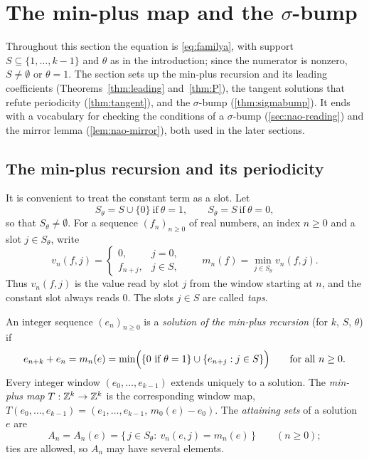 \section{The min-plus map and the \texorpdfstring{$\sigma$}{sigma}-bump}
\label{sec:tropical}

Throughout this section the equation is \eqref{eq:familya}, with support
$S\subseteq\{1,\dots,k-1\}$ and $\theta$ as in the introduction; since the
numerator is nonzero, $S\ne\emptyset$ or $\theta=1$. The section sets up the
min-plus recursion and its leading coefficients (Theorems~\ref{thm:leading}
and~\ref{thm:P}), the tangent solutions that refute periodicity
(\autoref{thm:tangent}), and the $\sigma$-bump (\autoref{thm:sigmabump}). It
ends with a vocabulary for checking the conditions of a $\sigma$-bump
(\autoref{sec:nao-reading}) and the mirror lemma (\autoref{lem:nao-mirror}),
both used in the later sections.

\subsection{The min-plus recursion and its periodicity}
\label{sec:trop-minplus}

It is convenient to treat the constant term as a slot. Let
\[
S_\theta=S\cup\{0\}\ \text{if}\ \theta=1,\qquad S_\theta=S\ \text{if}\ \theta=0,
\]
so that $S_\theta\ne\emptyset$. For a sequence $(f_n)_{n\ge0}$ of real numbers, an index
$n\ge0$ and a slot $j\in S_\theta$, write
\[
v_n(f,j)=\begin{cases}0,&j=0,\\ f_{n+j},&j\in S,\end{cases}
\qquad
m_n(f)=\min_{j\in S_\theta}v_n(f,j).
\]
Thus $v_n(f,j)$ is the value read by slot $j$ from the window starting at $n$, and
the constant slot always reads $0$. The slots $j\in S$ are called \emph{taps}.

\begin{definition}
\label{def:trop-minplus}
An integer sequence $(e_n)_{n\ge0}$ is a \textit{solution of the min-plus
recursion} (for $k$, $S$, $\theta$) if
\begin{equation}
e_{n+k}+e_n=m_n(e)=\min\Bigl(\{0\ \text{if}\ \theta=1\}\cup\{e_{n+j}:j\in S\}\Bigr)
\qquad\text{for all}\ n\ge0.
\label{eq:trop-rec}
\end{equation}
Every integer window $(e_0,\dots,e_{k-1})$ extends uniquely to a solution. The
\textit{min-plus map} $T:\mathbb{Z}^k\to\mathbb{Z}^k$ is the corresponding window map,
$T(e_0,\dots,e_{k-1})=(e_1,\dots,e_{k-1},\,m_0(e)-e_0)$. The
\textit{attaining sets} of a solution $e$ are
\[
A_n=A_n(e)=\{\,j\in S_\theta:\ v_n(e,j)=m_n(e)\,\}\qquad(n\ge0);
\]
ties are allowed, so $A_n$ may have several elements.
\end{definition}

